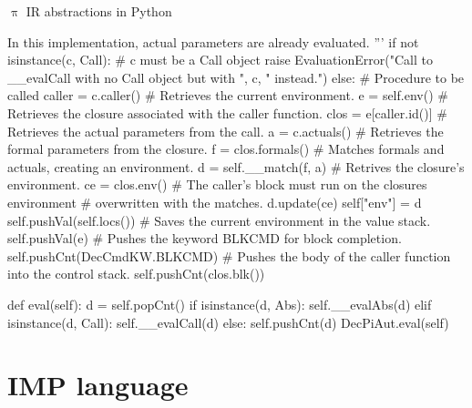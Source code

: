 \documentclass{beamer}
\begin{document}
\begin{frame}{{\color{red}$\uppi$ IR} abstractions in Python}
\begin{python}
        In this implementation, actual parameters are already evaluated.
        '''
        if not isinstance(c, Call):    # c must be a Call object
            raise EvaluationError("Call to __evalCall with no Call object but with ", c, " instead.")
        else:
            # Procedure to be called
            caller = c.caller()            
            # Retrieves the current environment.
            e = self.env()                 
            # Retrieves the closure associated with the caller function.
            clos = e[caller.id()]
            # Retrieves the actual parameters from the call.
            a = c.actuals()
            # Retrieves the formal parameters from the closure.
            f = clos.formals()
            # Matches formals and actuals, creating an environment.
            d = self.__match(f, a)
            # Retrives the closure's environment.
            ce = clos.env()      
            # The caller's block must run on the closures environment
            # overwritten with the matches.
            d.update(ce)
            self["env"] = d
            self.pushVal(self.locs())
            # Saves the current environment in the value stack.
            self.pushVal(e)
            # Pushes the keyword BLKCMD for block completion.
            self.pushCnt(DecCmdKW.BLKCMD)
            # Pushes the body of the caller function into the control stack.
            self.pushCnt(clos.blk())

    def eval(self):
        d = self.popCnt()
        if isinstance(d, Abs):
            self.__evalAbs(d)
        elif isinstance(d, Call):
            self.__evalCall(d)
        else:
            self.pushCnt(d)
            DecPiAut.eval(self)
\end{python}

\end{frame}


\section{\textsc{IMP} language}
\end{document}
